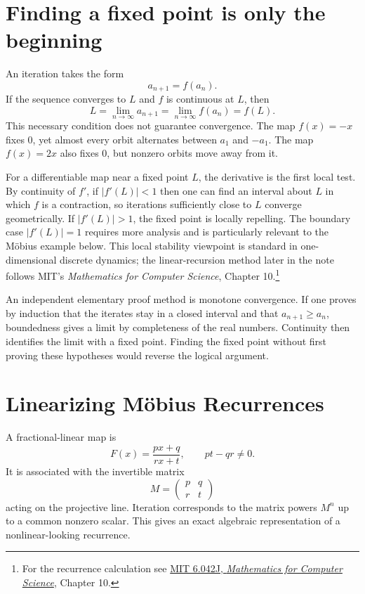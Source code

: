 
\section{Finding a fixed point is only the beginning}

An iteration takes the form
\[
 a_{n+1}=f(a_n).
\]
If the sequence converges to \(L\) and \(f\) is continuous at \(L\), then
\[
 L=\lim_{n\to\infty}a_{n+1}
  =\lim_{n\to\infty}f(a_n)=f(L).
\]
This necessary condition does not guarantee convergence. The map \(f(x)=-x\) fixes \(0\), yet almost every orbit alternates between \(a_1\) and \(-a_1\). The map \(f(x)=2x\) also fixes \(0\), but nonzero orbits move away from it.

For a differentiable map near a fixed point \(L\), the derivative is the first local test. By continuity of \(f'\), if \(|f'(L)|<1\) then one can find an interval about \(L\) in which \(f\) is a contraction, so iterations sufficiently close to \(L\) converge geometrically. If \(|f'(L)|>1\), the fixed point is locally repelling. The boundary case \(|f'(L)|=1\) requires more analysis and is particularly relevant to the Möbius example below. This local stability viewpoint is standard in one-dimensional discrete dynamics; the linear-recursion method later in the note follows MIT's \emph{Mathematics for Computer Science}, Chapter 10.\footnote{For the recurrence calculation see \href{https://ocw.mit.edu/courses/6-042j-mathematics-for-computer-science-fall-2010/resources/mit6_042jf10_chap10/}{MIT 6.042J, \emph{Mathematics for Computer Science}}, Chapter 10.}

An independent elementary proof method is monotone convergence. If one proves by induction that the iterates stay in a closed interval and that \(a_{n+1}\ge a_n\), boundedness gives a limit by completeness of the real numbers. Continuity then identifies the limit with a fixed point. Finding the fixed point without first proving these hypotheses would reverse the logical argument.

\section{Linearizing Möbius Recurrences}

A fractional-linear map is
\[
 F(x)=\frac{px+q}{rx+t},
 \qquad pt-qr\ne0.
\]
It is associated with the invertible matrix
\[
 M=\begin{pmatrix}p&q\\r&t\end{pmatrix}
\]
acting on the projective line. Iteration corresponds to the matrix powers \(M^n\) up to a common nonzero scalar. This gives an exact algebraic representation of a nonlinear-looking recurrence.

